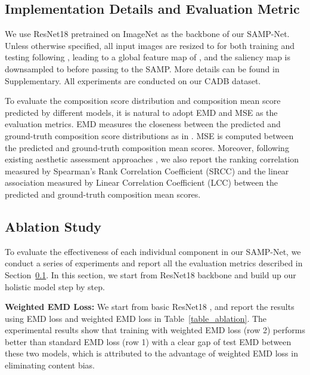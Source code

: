 \documentclass{bmvc2k}
\begin{document}
\subsection{Implementation Details and Evaluation Metric}
\label{sec:implement_and_metric}
We use ResNet18 \cite{he2016deep} pretrained on ImageNet \cite{deng2009imagenet} as the backbone of our SAMP-Net. Unless otherwise specified, all input images are resized to  for both training and testing following \cite{li2020personality,schwarz2018will,ko2018pac}, leading to a global feature map of , and the saliency map is downsampled to  before passing to the SAMP. More details can be found in Supplementary. All experiments are conducted on our CADB dataset. 

To evaluate the composition score distribution and composition mean score predicted by different models, it is natural to adopt EMD and MSE as the evaluation metrics. EMD measures the closeness between the predicted and ground-truth composition score distributions as in \cite{Hou2016SquaredEM}. MSE is computed between the predicted and ground-truth  composition mean scores. Moreover, following existing aesthetic assessment approaches \cite{Kong2016PhotoAR, Talebi2018NIMANI, Chen2020AdaptiveFD}, we also report the ranking correlation measured by Spearman's Rank Correlation Coefficient (SRCC) and the linear association measured by Linear Correlation Coefficient (LCC) between the predicted and ground-truth composition mean scores.  
\vspace{-2mm}
\subsection{Ablation Study}
\label{sec:ablation}

To evaluate the effectiveness of each individual component in our SAMP-Net, we conduct a series of experiments and report all the evaluation metrics described in Section~\ref{sec:implement_and_metric}. In this section, we start from ResNet18 backbone and build up our holistic model step by step.

\noindent\textbf{Weighted EMD Loss:} We start from basic ResNet18 \cite{he2016deep}, and report the results using EMD loss and weighted EMD loss in Table~\ref{table_ablation}. The experimental results show that training with weighted EMD loss (row 2) performs better than standard EMD loss (row 1) with a clear gap of test EMD between these two models, which is attributed to the advantage of weighted EMD loss in eliminating content bias. 
\end{document}
